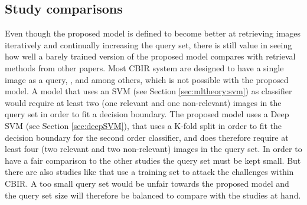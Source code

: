 \subsection{Study comparisons}
\label{sec:meth:eval:studycomp}

Even though the proposed model is defined to become better at retrieving images iteratively and continually increasing the query set, there is still value in seeing how well a barely trained version of the proposed model compares with retrieval methods from other papers. Most CBIR system are designed to have a single image as a query, \cite{wang2001simplicity}, \cite{subrahmanyam2013modified} and \cite{nagaraja2015low} among others, which is not possible with the proposed model. A model that uses an SVM (see Section \ref{sec:mltheory:svm}) as classifier would require at least two (one relevant and one non-relevant) images in the query set in order to fit a decision boundary. The proposed model uses a Deep SVM (see Section \ref{sec:deepSVM}), that uses a K-fold split in order to fit the decision boundary for the second order classifier, and does therefore require at least four (two relevant and two non-relevant) images in the query set. In order to have a fair comparison to the other studies the query set must be kept small. But there are also studies like \cite{elalami2014new} that use a training set to attack the challenges within CBIR. A too small query set would be unfair towards the proposed model and the query set size will therefore be balanced to compare with the studies at hand.

